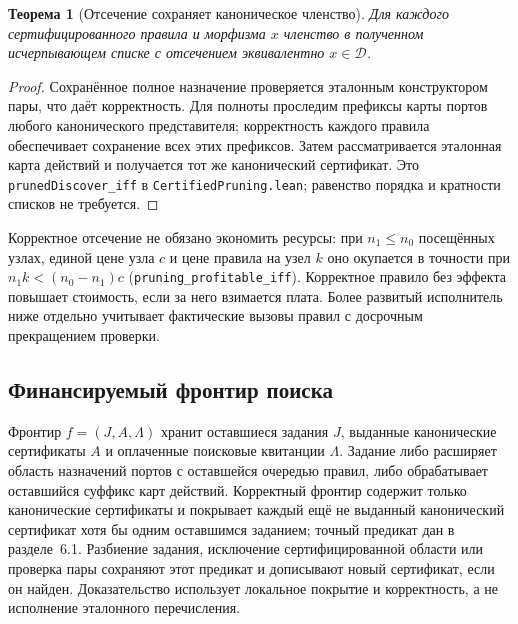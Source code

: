 \documentclass[10pt,a4paper]{article}
\newtheorem{theorem}{Теорема}[section]
\newcommand{\CanonRef}{\mathcal D}
\newcommand{\rc}[1]{\allowbreak\texttt{#1}\allowbreak}
\begin{document}
\begin{theorem}[Отсечение сохраняет каноническое членство]\label{thm:prune}
Для каждого сертифицированного правила и морфизма $x$ членство в полученном исчерпывающем списке с отсечением эквивалентно $x\in\CanonRef$.
\end{theorem}
\begin{proof}
Сохранённое полное назначение проверяется эталонным конструктором пары, что даёт корректность. Для полноты проследим префиксы карты портов любого канонического представителя; корректность каждого правила обеспечивает сохранение всех этих префиксов. Затем рассматривается эталонная карта действий и получается тот же канонический сертификат. Это \rc{prunedDiscover\_iff} в \rc{CertifiedPruning.lean}; равенство порядка и кратности списков не требуется.
\end{proof}
Корректное отсечение не обязано экономить ресурсы: при $n_1\le n_0$ посещённых узлах, единой цене узла $c$ и цене правила на узел $k$ оно окупается в точности при $n_1 k<(n_0-n_1)c$ (\rc{pruning\_profitable\_iff}). Корректное правило без эффекта повышает стоимость, если за него взимается плата. Более развитый исполнитель ниже отдельно учитывает фактические вызовы правил с досрочным прекращением проверки.

\subsection{Финансируемый фронтир поиска}
Фронтир $f=(J,A,\Lambda)$ хранит оставшиеся задания $J$, выданные канонические сертификаты $A$ и оплаченные поисковые квитанции $\Lambda$. Задание либо расширяет область назначений портов с оставшейся очередью правил, либо обрабатывает оставшийся суффикс карт действий. Корректный фронтир содержит только канонические сертификаты и покрывает каждый ещё не выданный канонический сертификат хотя бы одним оставшимся заданием; точный предикат дан в разделе~6.1. Разбиение задания, исключение сертифицированной области или проверка пары сохраняют этот предикат и дописывают новый сертификат, если он найден. Доказательство использует локальное покрытие и корректность, а не исполнение эталонного перечисления.
\end{document}
